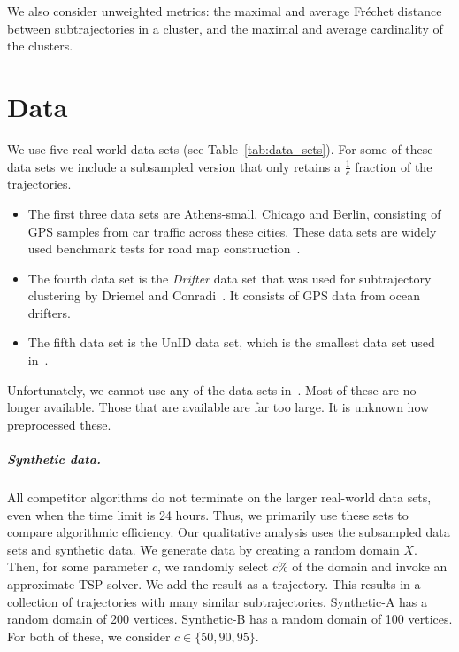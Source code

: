 \documentclass[11pt]{article}
\newcommand{\frechet}{Fr\'{e}chet\xspace}
\newcommand{\pathlet}{cluster\xspace}
\newcommand{\pathlets}{clusters\xspace}
\begin{document}
%
%
\noindent
We also consider unweighted  metrics:
 the maximal and average \frechet distance between subtrajectories in a \pathlet, and
the maximal and average cardinality of the \pathlets.
%
\section{Data}
%
We use five real-world data sets (see Table~\ref{tab:data_sets}). For some of these data sets we include a subsampled version that only retains a $\frac{1}{c}$ fraction of the trajectories.
%
\begin{itemize}
    \item The first three data sets are Athens-small, Chicago and Berlin, consisting of GPS samples from car traffic across these cities.  These data sets are widely used
benchmark tests for road map construction~\cite{ahmed2015comparison, buchin2017clustering, wang2015efficient, huang2018automatic}. 
\item 
The fourth data set is the \emph{Drifter} data set that was used for subtrajectory clustering by Driemel and Conradi~\cite{conradi2023finding}. It consists of GPS data from ocean drifters.
\item The fifth data set is the UnID data set, which is the smallest data set used in~\cite{9827305}. 
\end{itemize}
%
\noindent
Unfortunately, we cannot use any of the data sets in~\cite{agarwal2018subtrajectory}. Most of these are no longer available.  Those that are available are far too large. It is unknown how~\cite{agarwal2018subtrajectory} preprocessed these. 
%
\subparagraph{Synthetic data.}
All competitor algorithms do not terminate on the larger real-world data sets, even when the time limit is 24 hours. Thus, we primarily use these sets to  compare algorithmic efficiency. 
Our qualitative analysis uses the subsampled data sets and synthetic data. We generate data by creating a random domain $X$. 
Then, for some parameter $c$, we randomly select $c \%$ of the domain and invoke an approximate TSP solver. We add the result as a trajectory. This results in a collection of trajectories with many similar subtrajectories. 
Synthetic-A has a random domain of 200 vertices. Synthetic-B has a random domain of 100 vertices. For both of these, we consider $c \in \{50, 90, 95\}$.
%
%
\vspace{1cm}
%
%
%
%
\end{document}
